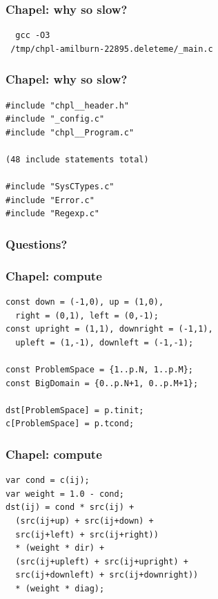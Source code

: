 \documentclass{beamer}
\begin{document}
\begin{frame}[fragile]
 \frametitle{Chapel: why so slow?}
\begin{verbatim}
  gcc -O3
 /tmp/chpl-amilburn-22895.deleteme/_main.c
\end{verbatim}
\end{frame}

\begin{frame}[fragile]
 \frametitle{Chapel: why so slow?}
\begin{verbatim}
#include "chpl__header.h"
#include "_config.c"
#include "chpl__Program.c"

(48 include statements total)

#include "SysCTypes.c"
#include "Error.c"
#include "Regexp.c"
\end{verbatim}
\end{frame}

\begin{frame}
 \frametitle{Questions?}
\end{frame}

\begin{frame}[fragile]
 \frametitle{Chapel: compute}
\begin{verbatim}
const down = (-1,0), up = (1,0),
  right = (0,1), left = (0,-1);
const upright = (1,1), downright = (-1,1),
  upleft = (1,-1), downleft = (-1,-1);

const ProblemSpace = {1..p.N, 1..p.M};
const BigDomain = {0..p.N+1, 0..p.M+1};

dst[ProblemSpace] = p.tinit;
c[ProblemSpace] = p.tcond;
\end{verbatim}
\end{frame}

\begin{frame}[fragile]
 \frametitle{Chapel: compute}
\begin{verbatim}
var cond = c(ij);
var weight = 1.0 - cond;
dst(ij) = cond * src(ij) +
  (src(ij+up) + src(ij+down) +
  src(ij+left) + src(ij+right))
  * (weight * dir) +
  (src(ij+upleft) + src(ij+upright) +
  src(ij+downleft) + src(ij+downright))
  * (weight * diag);
\end{verbatim}
\end{frame}
\end{document}
